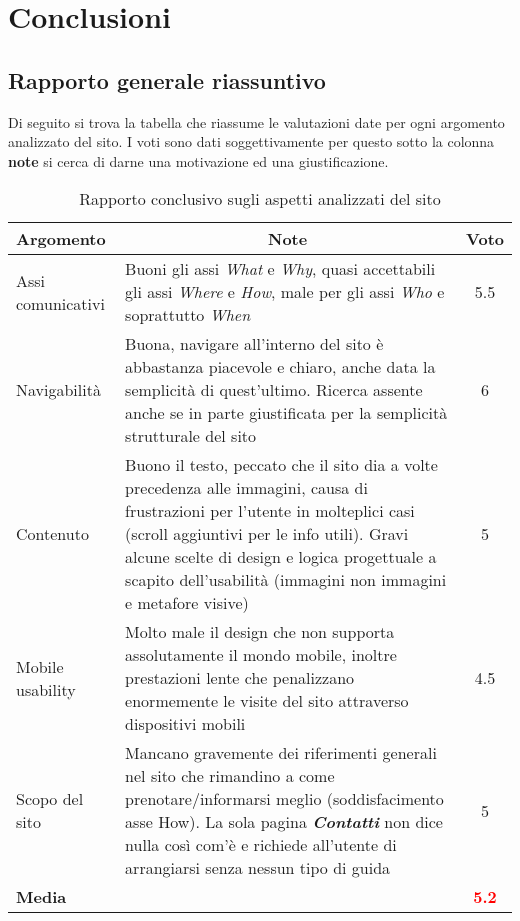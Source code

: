 \documentclass[../Relazione.tex]{subfiles}
\begin{document}
\section{Conclusioni}

	\subsection{Rapporto generale riassuntivo}
	Di seguito si trova la tabella che riassume le valutazioni date per ogni argomento analizzato del sito. I voti sono dati soggettivamente per questo sotto la colonna \textbf{note} si cerca di darne una motivazione ed una giustificazione.\vspace*{1cm}
	\begin{table} [h]
		\centering
		\begin{tabularx}{\textwidth}{lXc}
			\toprule
			\textbf{Argomento} & \multicolumn{1}{c}{\textbf{Note}} & \textbf{Voto} \\
			\toprule
			Assi comunicativi & Buoni gli assi \textit{What} e \textit{Why}, quasi accettabili gli assi \textit{Where} e \textit{How}, male per gli assi \textit{Who} e soprattutto \textit{When} & 5.5 \\
			\midrule
			Navigabilità & Buona, navigare all'interno del sito è abbastanza piacevole e chiaro, anche data la semplicità di quest'ultimo. Ricerca assente anche se in parte giustificata per la semplicità strutturale del sito & 6 \\
			\midrule
			Contenuto & Buono il testo, peccato che il sito dia a volte precedenza alle immagini, causa di frustrazioni per l'utente in molteplici casi (scroll aggiuntivi per le info utili). Gravi alcune scelte di design e logica progettuale a scapito dell'usabilità (immagini non immagini e metafore visive) & 5 \\
			\midrule
			Mobile usability & Molto male il design che non supporta assolutamente il mondo mobile, inoltre prestazioni lente che penalizzano enormemente le visite del sito attraverso dispositivi mobili & 4.5 \\
			\midrule
			Scopo del sito &  Mancano gravemente dei riferimenti generali nel sito che rimandino a come prenotare/informarsi meglio (soddisfacimento asse How). La sola pagina \textbf{\emph{Contatti}} non dice nulla così com'è e richiede all'utente di arrangiarsi senza nessun tipo di guida & 5 \\
			\midrule
			\textbf{Media} & & \textbf{\textcolor{red}{5.2}} \\
			\midrule
		\end{tabularx}
		\caption{Rapporto conclusivo sugli aspetti analizzati del sito}
		\label{tab:ValutazioniFinali}
	\end{table}
	
\end{document}
